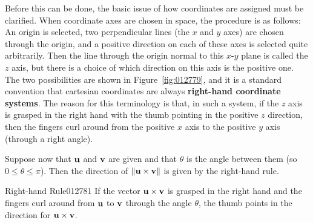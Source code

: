 Before this can be done, the basic issue of how coordinates are assigned must be clarified. When coordinate axes are chosen in space, the procedure is as follows: An origin is selected, two perpendicular lines (the $x$ and $y$ axes) are chosen through the origin, and a positive direction on each of these axes is selected quite arbitrarily. Then the line through the origin normal to this $x$-$y$ plane is called the $z$ axis, but there is a choice of which direction on this axis is the positive one. The two possibilities are shown in Figure~\ref{fig:012779}, and it is a standard convention that cartesian coordinates are always \textbf{right-hand coordinate systems}. The reason for this terminology is that, in such a system, if the $z$ axis is grasped in the right hand with the thumb pointing in the positive $z$ direction, then the fingers curl around from the positive $x$ axis to the positive $y$ axis (through a right angle).

Suppose now that $\textbf{u}$ and $\textbf{v}$ are given and that $\theta$ is the angle between them (so $0 \leq \theta \leq \pi$). Then the direction of $\|\textbf{u} \times \textbf{v}\|$ is given by the right-hand rule.


\begin{theorem*}{Right-hand Rule}{012781}
If the vector $\textbf{u} \times \textbf{v}$ is grasped in the right hand and the fingers curl around from $\textbf{u}$ to $\textbf{v}$ through the angle $\theta$, the thumb points in the direction for $\textbf{u} \times \textbf{v}$.
\end{theorem*}

\begin{wrapfigure}[12]{l}{5cm} 
\centering

\caption{\label{fig:012789}}
\end{wrapfigure}

